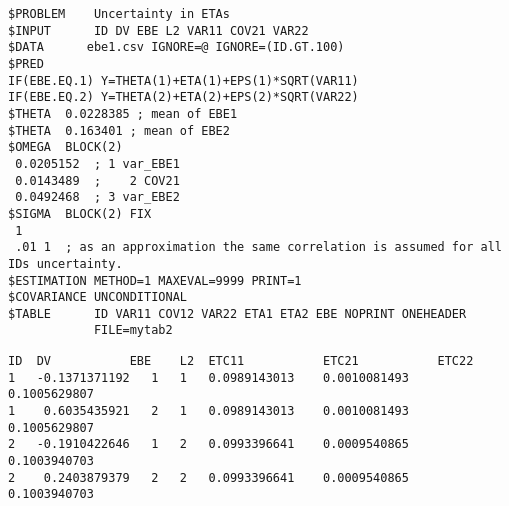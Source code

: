 \documentclass{article}
\begin{document}
\newpage
\begin{verbatim}
$PROBLEM    Uncertainty in ETAs
$INPUT      ID DV EBE L2 VAR11 COV21 VAR22
$DATA      ebe1.csv IGNORE=@ IGNORE=(ID.GT.100)
$PRED  
IF(EBE.EQ.1) Y=THETA(1)+ETA(1)+EPS(1)*SQRT(VAR11)
IF(EBE.EQ.2) Y=THETA(2)+ETA(2)+EPS(2)*SQRT(VAR22)
$THETA  0.0228385 ; mean of EBE1
$THETA  0.163401 ; mean of EBE2
$OMEGA  BLOCK(2)
 0.0205152  ; 1 var_EBE1
 0.0143489  ;    2 COV21
 0.0492468  ; 3 var_EBE2
$SIGMA  BLOCK(2) FIX
 1
 .01 1  ; as an approximation the same correlation is assumed for all IDs uncertainty.
$ESTIMATION METHOD=1 MAXEVAL=9999 PRINT=1
$COVARIANCE UNCONDITIONAL
$TABLE      ID VAR11 COV12 VAR22 ETA1 ETA2 EBE NOPRINT ONEHEADER
            FILE=mytab2
\end{verbatim}

\begin{verbatim}
ID	DV	         EBE	L2	ETC11	        ETC21	        ETC22
1	-0.1371371192	1	1	0.0989143013	0.0010081493	0.1005629807
1	 0.6035435921	2	1	0.0989143013	0.0010081493	0.1005629807
2	-0.1910422646	1	2	0.0993396641	0.0009540865	0.1003940703
2	 0.2403879379	2	2	0.0993396641	0.0009540865	0.1003940703
\end{verbatim}
\end{document}
